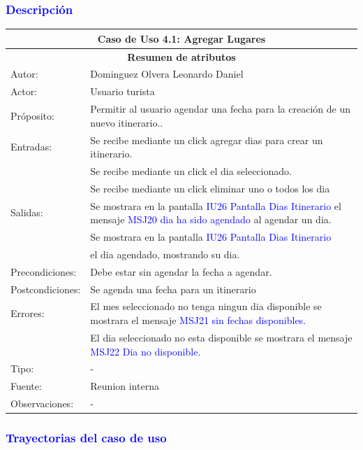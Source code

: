 \subsubsection{\textcolor{blue}{Descripción}}
\begin{tabularx}{16cm}{||l|X||}
	\hline
	\multicolumn{2}{||c||}{Caso de Uso 4.1: Agregar Lugares} \\
	\hline
	\multicolumn{2}{||c||}{\textbf{Resumen de atributos}} \\
	\hline
	{Autor:} & Dominguez Olvera Leonardo Daniel \\
    \hline
	{Actor:} & Usuario turista\\
	\hline
	{Próposito:} & Permitir al usuario agendar una fecha para la creación de un nuevo itinerario..\\
	\hline
	{Entradas:}&Se recibe mediante un click agregar dias para crear un itinerario.\\
  &Se recibe mediante un click el dia seleccionado.\\
  & Se recibe mediante un click eliminar uno o todos los dia \\
	\hline
	{Salidas:} &Se mostrara en la pantalla \textcolor{blue}{IU26 Pantalla Dias Itinerario} el mensaje \textcolor{blue}{MSJ20 dia ha sido agendado} al agendar un dia.  \\
  & Se mostrara en la pantalla \textcolor{blue}{IU26 Pantalla Dias Itinerario}\\
  &el dia agendado, mostrando su dia.\\
	\hline
	{Precondiciones:} & Debe estar sin agendar la fecha a agendar.\\
	\hline
	{Postcondiciones:}  & Se agenda una fecha para un itinerario\\
	\hline
	{Errores:} & El mes seleccionado no tenga ningun dia disponible se mostrara el mensaje \textcolor{blue}{MSJ21 sin fechas disponibles.} \\
 & El dia seleccionado no esta disponible se mostrara el mensaje \textcolor{blue}{MSJ22 Dia no disponible.} \\
  
	\hline
	{Tipo:} & -\\
	\hline
	{Fuente:} & Reunion interna \\
	\hline
	{Observaciones:} & {-} \\
	\hline
\end{tabularx}

\pagebreak
\subsubsection{\textcolor{blue}{Trayectorias del caso de uso}}

